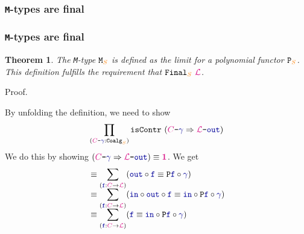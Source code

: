 \documentclass[xelatex,mathserif,serif,notheorems]{beamer} %
\theoremstyle{plain} %
\newtheorem{thm}{Theorem}[section]
\theoremstyle{definition}
\theoremstyle{remark}
\newcommand*{\type}[1]{\textcolor{magenta!90!black}{#1}}
\newcommand*{\container}[1]{\textcolor{orange}{#1}}
\newcommand*{\unit}{\type{\textbf{1}}}
\newcommand*{\coalg}[2]{#1\texttt{-}#2}
\newcommand*{\function}[1]{\textcolor{blue!60!black}{\ensuremath{\mathtt{#1}}}}
\newcommand*{\typeformer}[1]{\ensuremath{\mathtt{#1}}}
\newcommand*{\functor}[1]{\ensuremath{\mathbf{\mathtt{#1}}}}
\newcommand{\setlengths}{
  \setlength{\abovedisplayskip}{4pt}
  \setlength{\belowdisplayskip}{4pt}
  \setlength{\abovedisplayshortskip}{2pt}
  \setlength{\belowdisplayshortskip}{2pt}
}
\begin{document}
\subsubsection{\texttt{M}-types are final}
\begin{frame}
  \frametitle{\texttt{M}-types are final}
  \begin{thm}\setlengths
    The \texttt{M}-type \(\typeformer{M}_{\container{S}}\) is defined as the limit for a polynomial functor \(\functor{P}_{\container{S}}\). This definition fulfills the requirement that \(\typeformer{Final}_{\container{S}}~\type{\mathcal{L}}\).
  \end{thm}
  \begin{block}{Proof.}\setlengths
    By unfolding the definition, we need to show
    \begin{equation}
      \prod_{(\coalg{\type{C}}{\function{\gamma}} : \mathtt{Coalg}_{\container{S}})} \mathtt{isContr}~(\coalg{\type{C}}{\function{\gamma}} \Rightarrow \coalg{\type{\mathcal{L}}}{\function{out}})
    \end{equation}
    We do this by showing \((\coalg{\type{C}}{\function{\gamma}} \Rightarrow \coalg{\type{\mathcal{L}}}{\function{out}}) \equiv \unit\). We get
    \begin{align}
      &\equiv \sum_{(\function{f} : \type{C} \rightarrow \type{\mathcal{L}})} (\function{out} \circ \function{f} \equiv \functor{P}\function{f} \circ \function{\gamma}) \\[-2mm]
      &\equiv \sum_{(\function{f} : \type{C} \rightarrow \type{\mathcal{L}})} (\function{in} \circ \function{out} \circ \function{f} \equiv \function{in} \circ \functor{P}\function{f} \circ \function{\gamma}) \\[-2mm]
      &\equiv \sum_{(\function{f} : \type{C} \rightarrow \type{\mathcal{L}})} (\function{f} \equiv \function{in} \circ \functor{P}\function{f} \circ \function{\gamma})
    \end{align}
  \end{block}
\end{frame}
\end{document}

